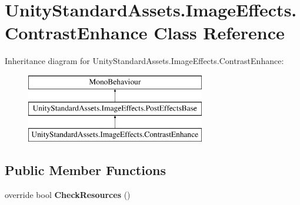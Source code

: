 \hypertarget{class_unity_standard_assets_1_1_image_effects_1_1_contrast_enhance}{}\section{Unity\+Standard\+Assets.\+Image\+Effects.\+Contrast\+Enhance Class Reference}
\label{class_unity_standard_assets_1_1_image_effects_1_1_contrast_enhance}
Inheritance diagram for Unity\+Standard\+Assets.\+Image\+Effects.\+Contrast\+Enhance\+:\begin{figure}[H]
\begin{center}
\leavevmode
\includegraphics[height=3.000000cm]{class_unity_standard_assets_1_1_image_effects_1_1_contrast_enhance}
\end{center}
\end{figure}
\subsection*{Public Member Functions}
\begin{DoxyCompactItemize}
\item 
override bool {\bfseries Check\+Resources} ()\hypertarget{class_unity_standard_assets_1_1_image_effects_1_1_contrast_enhance_adfe9a436236fbb2df7edfbeaa7490406}{}\label{class_unity_standard_assets_1_1_image_effects_1_1_contrast_enhance_adfe9a436236fbb2df7edfbeaa7490406}

\end{DoxyCompactItemize}
